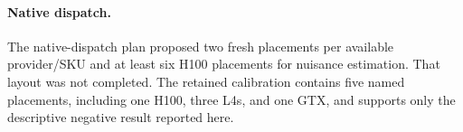 \paragraph{Native dispatch.}
\label{app:native-deviation}

The native-dispatch plan proposed two fresh placements per available
provider/SKU and at least six H100 placements for nuisance estimation. That
layout was not completed. The retained calibration contains five named
placements, including one H100, three L4s, and one GTX, and supports only the
descriptive negative result reported here.
